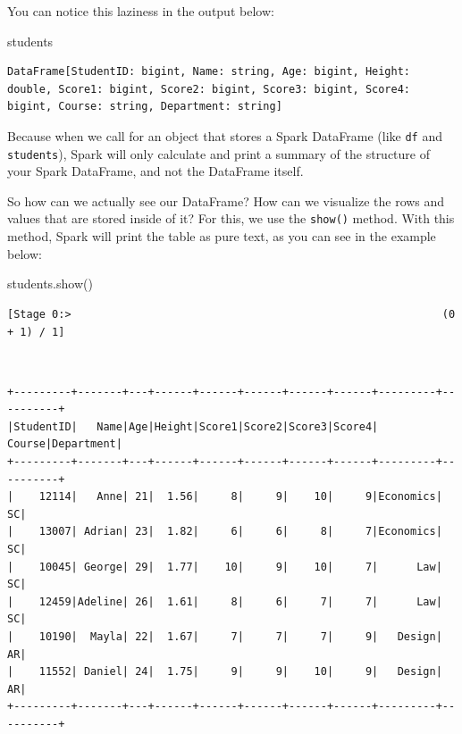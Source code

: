 \documentclass[
  11pt,
  letterpaper,
  DIV=11,
  numbers=noendperiod]{scrreprt}
\newenvironment{Shaded}{\begin{snugshade}}{\end{snugshade}}
\newcommand{\NormalTok}[1]{\textcolor[rgb]{0.00,0.23,0.31}{#1}}
\begin{document}
You can notice this laziness in the output below:

\begin{Shaded}
\begin{Highlighting}[]
\NormalTok{students}
\end{Highlighting}
\end{Shaded}

\begin{verbatim}
DataFrame[StudentID: bigint, Name: string, Age: bigint, Height: double, Score1: bigint, Score2: bigint, Score3: bigint, Score4: bigint, Course: string, Department: string]
\end{verbatim}

Because when we call for an object that stores a Spark DataFrame (like
\texttt{df} and \texttt{students}), Spark will only calculate and print
a summary of the structure of your Spark DataFrame, and not the
DataFrame itself.

So how can we actually see our DataFrame? How can we visualize the rows
and values that are stored inside of it? For this, we use the
\texttt{show()} method. With this method, Spark will print the table as
pure text, as you can see in the example below:

\begin{Shaded}
\begin{Highlighting}[]
\NormalTok{students.show()}
\end{Highlighting}
\end{Shaded}

\begin{verbatim}
[Stage 0:>                                                          (0 + 1) / 1]
\end{verbatim}

\begin{verbatim}
                                                                                
\end{verbatim}

\begin{verbatim}
+---------+-------+---+------+------+------+------+------+---------+----------+
|StudentID|   Name|Age|Height|Score1|Score2|Score3|Score4|   Course|Department|
+---------+-------+---+------+------+------+------+------+---------+----------+
|    12114|   Anne| 21|  1.56|     8|     9|    10|     9|Economics|        SC|
|    13007| Adrian| 23|  1.82|     6|     6|     8|     7|Economics|        SC|
|    10045| George| 29|  1.77|    10|     9|    10|     7|      Law|        SC|
|    12459|Adeline| 26|  1.61|     8|     6|     7|     7|      Law|        SC|
|    10190|  Mayla| 22|  1.67|     7|     7|     7|     9|   Design|        AR|
|    11552| Daniel| 24|  1.75|     9|     9|    10|     9|   Design|        AR|
+---------+-------+---+------+------+------+------+------+---------+----------+
\end{verbatim}
\end{document}
